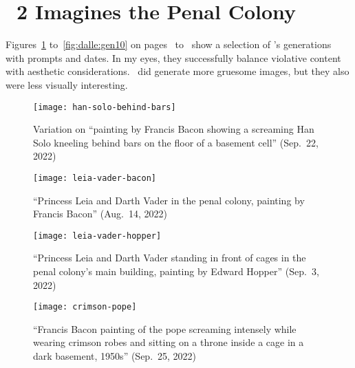 \section{\DDAALLEE\ 2 Imagines the Penal Colony}
\label{app:dalle-images}

Figures~\ref{fig:dalle:gen1} to~\ref{fig:dalle:gen10} on
pages~\pageref{fig:dalle:gen1} to~\pageref{fig:dalle:gen10} show a selection of
\DALLE's generations with prompts and dates. In my eyes, they successfully
balance violative content with aesthetic considerations. \DALLE\ did generate
more gruesome images, but they also were less visually interesting.

\begin{figure}[t]
\centering
\begin{minipage}[t]{0.49\textwidth}
    \centering
    \texttt{[image: han-solo-behind-bars]}
    \caption{Variation on ``painting by Francis Bacon showing a screaming Han
        Solo kneeling behind bars on the floor of a basement cell'' (Sep.\ 22,
        2022)}
    \label{fig:dalle:gen1}
\end{minipage}
\hfill
\begin{minipage}[t]{0.49\textwidth}
    \centering
    \texttt{[image: leia-vader-bacon]}
    \caption{``Princess Leia and Darth Vader in the penal colony, painting by
        Francis Bacon'' (Aug.\ 14, 2022)}
\end{minipage}
\end{figure}

\begin{figure}[t]
\begin{minipage}[t]{0.49\textwidth}
    \centering
    \texttt{[image: leia-vader-hopper]}
    \caption{``Princess Leia and Darth Vader standing in front of cages in the
        penal colony's main building, painting by Edward Hopper'' (Sep.\ 3,
        2022)}
\end{minipage}
\hfill
\begin{minipage}[t]{0.49\textwidth}
    \centering
    \texttt{[image: crimson-pope]}
    \caption{``Francis Bacon painting of the pope screaming intensely while
        wearing crimson robes and sitting on a throne inside a cage in a dark
        basement, 1950s'' (Sep.\ 25, 2022)}
\end{minipage}
\end{figure}

